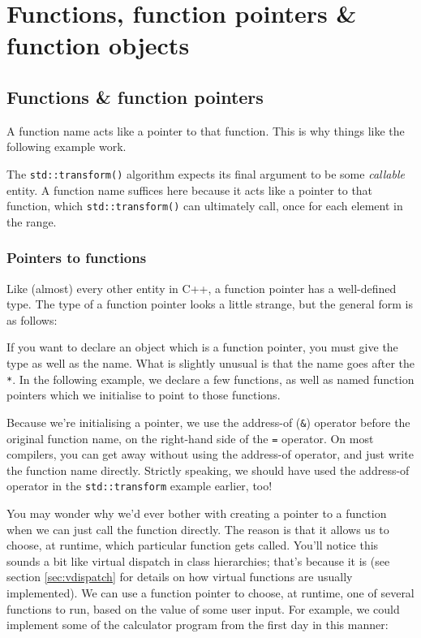 \documentclass[a4paper]{scrartcl}
\begin{document}
\section{Functions, function pointers \& function objects}
\subsection{Functions \& function pointers}
A function name acts like a pointer to that function. This is why things like the following example work.



The \verb|std::transform()| algorithm expects its final argument to be some \emph{callable} entity. A function name suffices here because it acts like a pointer to that function, which \verb|std::transform()| can ultimately call, once for each element in the range.

\subsubsection{Pointers to functions}
Like (almost) every other entity in C++, a function pointer has a well-defined type. The type of a function pointer looks a little strange, but the general form is as follows:



If you want to declare an object which is a function pointer, you must give the type as well as the name. What is slightly unusual is that the name goes after the \verb|*|. In the following example, we declare a few functions, as well as named function pointers which we initialise to point to those functions.



Because we're initialising a pointer, we use the address-of (\verb|&|) operator before the original function name, on the right-hand side of the \verb|=| operator. On most compilers, you can get away without using the address-of operator, and just write the function name directly. Strictly speaking, we should have used the address-of operator in the \texttt{std::transform} example earlier, too!

You may wonder why we'd ever bother with creating a pointer to a function when we can just call the function directly. The reason is that it allows us to choose, at runtime, which particular function gets called. You'll notice this sounds a bit like virtual dispatch in class hierarchies; that's because it is (see section \ref{sec:vdispatch} for details on how virtual functions are usually implemented). We can use a function pointer to choose, at runtime, one of several functions to run, based on the value of some user input. For example, we could implement some of the calculator program from the first day in this manner:
\end{document}
